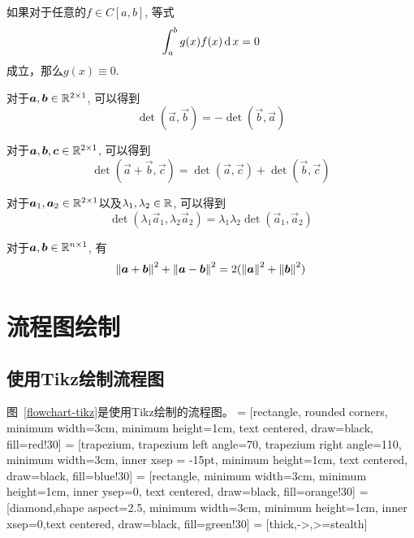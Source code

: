 \begin{lemma} 如果对于任意的$f\in C[a,b]$, 等式
$$
\int^b_a g(x) f(x)\operatorname{\mathrm{d}} x = 0
$$
成立，那么$g(x)\equiv 0$.
\end{lemma}

\begin{property}[反对称性]
对于$\bm{a},\bm{b}\in \mathbb{R}^{{2}\times {1}}$, 可以得到
$$
\det(\vec{a},\vec{b}) = - \det(\vec{b},\vec{a})
$$
\end{property}

\begin{property}[可加性]
对于$\bm{a},\bm{b},\bm{c}\in \mathbb{R}^{{2}\times {1}}$, 可以得到
$$
\det(\vec{a}+\vec{b},\vec{c}) = \det(\vec{a},\vec{c}) +\det(\vec{b},\vec{c})
$$
\end{property}

\begin{property}[多重线性]
对于$\bm{a}_1,\bm{a}_2\in \mathbb{R}^{{2}\times {1}}$以及$\lambda_1, \lambda_2\in\mathbb{R}$, 可以得到
$$
\det(\lambda_1\vec{a}_1,\lambda_2\vec{a}_2) = \lambda_1\lambda_2 \det(\vec{a}_1,\vec{a}_2)
$$
\end{property}


\begin{corollary}
对于$\bm{a},\bm{b}\in \mathbb{R}^{{n}\times {1}}$, 有
$$
\left\lVert \bm{a}+\bm{b} \right\rVert^2 + \left\lVert \bm{a}-\bm{b} \right\rVert^2 =2(\left\lVert \bm{a} \right\rVert^2 +\left\lVert \bm{b} \right\rVert^2)
$$
\end{corollary}



\section{流程图绘制}
\subsection{使用Tikz绘制流程图}
图~\ref{flowchart-tikz}是使用Tikz绘制的流程图。
\usetikzlibrary{shapes.geometric,arrows}
\usetikzlibrary{fit}
\usetikzlibrary{backgrounds}
 = [rectangle, rounded corners, minimum width=3cm, minimum height=1cm, text centered, draw=black, fill=red!30]
        = [trapezium, trapezium left angle=70, trapezium right angle=110, minimum width=3cm, inner xsep = -15pt, minimum height=1cm, text centered, draw=black, fill=blue!30]
   = [rectangle, minimum width=3cm, minimum height=1cm, inner ysep=0, text centered, draw=black, fill=orange!30]
  = [diamond,shape aspect=2.5, minimum width=3cm, minimum height=1cm, inner xsep=0,text centered, draw=black, fill=green!30]
     = [thick,->,>=stealth]


